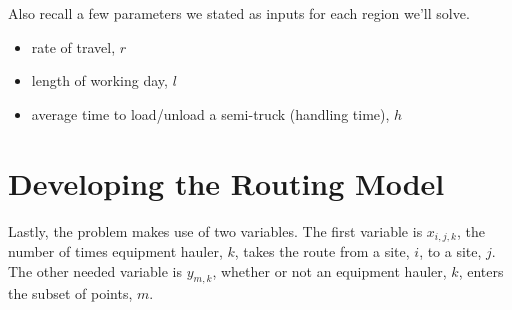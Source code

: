 \documentclass[letterpaper,10pt,english]{sphinxmanual}
\begin{document}
Also recall a few parameters we stated as inputs for each region we'll solve.
\begin{itemize}
\item {} 
rate of travel, \(r\)

\item {} 
length of working day, \(l\)

\item {} 
average time to load/unload a semi-truck (handling time), \(h\)

\end{itemize}


\section{Developing the Routing Model}
\label{\detokenize{daily-routing:developing-the-routing-model}}
Lastly, the problem makes use of two variables. The first variable is
\(x_{i,j,k}\), the number of times equipment hauler, \(k\), takes the
route from a site, \(i\), to a site, \(j\). The other needed variable
is \(y_{m,k}\), whether or not an equipment hauler, \(k\), enters the
subset of points, \(m\).
\end{document}
